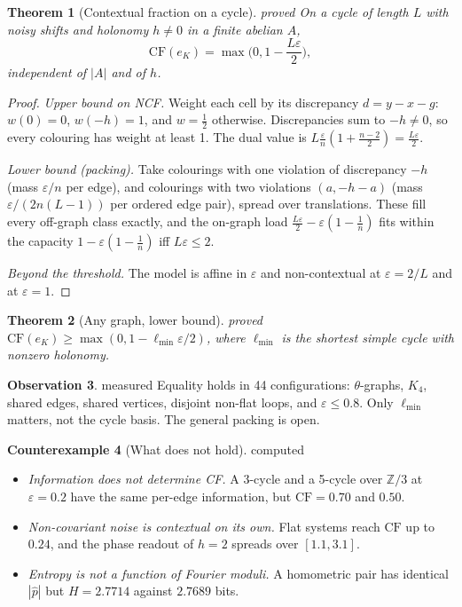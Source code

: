 \documentclass[11pt]{article}
\newtheorem{theorem}{Theorem}[section]
\theoremstyle{definition}
\newtheorem{observation}[theorem]{Observation}
\newtheorem{counterexample}[theorem]{Counterexample}
\theoremstyle{remark}
\newcommand{\Z}{\mathbb{Z}}
\newcommand{\CF}{\mathrm{CF}}
\newcommand{\lmin}{\ell_{\min}}
\newcommand{\st}[1]{\textsf{\small\color{gray}#1}}
\begin{document}
\begin{theorem}[Contextual fraction on a cycle]\label{thm:cfcycle}\st{proved}
On a cycle of length $L$ with noisy shifts and holonomy $h\ne0$ in a finite abelian $A$,
\[
\CF(e_K)=\max\!\Big(0,1-\frac{L\varepsilon}{2}\Big),
\]
independent of $|A|$ and of $h$.
\end{theorem}
\begin{proof}
\emph{Upper bound on NCF.} Weight each cell by its discrepancy $d=y-x-g$: $w(0)=0$, $w(-h)=1$, and $w=\tfrac12$ otherwise. Discrepancies sum to $-h\ne0$, so every colouring has weight at least 1. The dual value is $L\tfrac\varepsilon n(1+\tfrac{n-2}2)=\tfrac{L\varepsilon}2$.

\emph{Lower bound (packing).} Take colourings with one violation of discrepancy $-h$ (mass $\varepsilon/n$ per edge), and colourings with two violations $(a,-h-a)$ (mass $\varepsilon/(2n(L-1))$ per ordered edge pair), spread over translations. These fill every off-graph class exactly, and the on-graph load $\tfrac{L\varepsilon}2-\varepsilon(1-\tfrac1n)$ fits within the capacity $1-\varepsilon(1-\tfrac1n)$ iff $L\varepsilon\le2$.

\emph{Beyond the threshold.} The model is affine in $\varepsilon$ and non-contextual at $\varepsilon=2/L$ and at $\varepsilon=1$.
\end{proof}
\begin{theorem}[Any graph, lower bound]\label{thm:girth}\st{proved}
$\CF(e_K)\ge\max(0,1-\lmin\varepsilon/2)$, where $\lmin$ is the shortest simple cycle with nonzero holonomy.
\end{theorem}
\begin{observation}\st{measured}
Equality holds in 44 configurations: $\theta$-graphs, $K_4$, shared edges, shared vertices, disjoint non-flat loops, and $\varepsilon\le0.8$. Only $\lmin$ matters, not the cycle basis. The general packing is \st{open}.
\end{observation}
\begin{counterexample}[What does not hold]\label{ce:info}\st{computed}
\begin{itemize}
  \item \emph{Information does not determine CF.} A 3-cycle and a 5-cycle over $\Z/3$ at $\varepsilon=0.2$ have the same per-edge information, but $\CF=0.70$ and $0.50$.
  \item \emph{Non-covariant noise is contextual on its own.} Flat systems reach $\CF$ up to $0.24$, and the phase readout of $h=2$ spreads over $[1.1,3.1]$.
  \item \emph{Entropy is not a function of Fourier moduli.} A homometric pair has identical $|\hat p|$ but $H=2.7714$ against $2.7689$ bits.
\end{itemize}
\end{counterexample}
\end{document}
